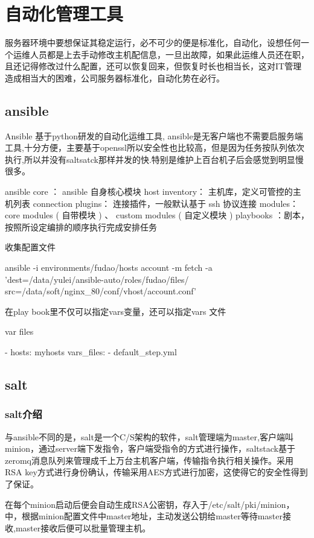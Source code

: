 \chapter{自动化管理工具}
服务器环境中要想保证其稳定运行，必不可少的便是标准化，自动化，设想任何一个运维人员都是上去手动修改主机配信息，一旦出故障，如果此运维人员还在职，且还记得修改过什么配置，还可以恢复回来，但恢复时长也相当长，这对IT管理造成相当大的困难，公司服务器标准化，自动化势在必行。
\section{ansible}
Ansible 基于python研发的自动化运维工具, ansible是无客户端也不需要启服务端工具,十分方便，主要基于openssl所以安全性也比较高，但是因为任务按队列依次执行,所以并没有saltsatck那样并发的快.特别是维护上百台机子后会感觉到明显慢很多。

ansible core ： ansible 自身核心模块
host inventory： 主机库，定义可管控的主机列表
connection plugins： 连接插件，一般默认基于 ssh 协议连接
modules：core modules ( 自带模块 ) 、 custom modules ( 自定义模块 )
playbooks ：剧本，按照所设定编排的顺序执行完成安排任务

收集配置文件

ansible -i environments/fudao/hosts  account -m fetch -a 'dest=/data/yulei/ansible-auto/roles/fudao/files/ src=/data/soft/nginx_80/conf/vhost/account.conf'

在play book里不仅可以指定vars变量，还可以指定vars 文件

var files

- hosts: myhosts
  vars_files:
    - default_step.yml


\section{salt}

\subsection{salt介绍}
与ansible不同的是，salt是一个C/S架构的软件，salt管理端为master,客户端叫minion，通过server端下发指令，客户端受指令的方式进行操作，saltstack基于zeromq消息队列来管理成千上万台主机客户端，传输指令执行相关操作。采用RSA key方式进行身份确认，传输采用AES方式进行加密，这使得它的安全性得到了保证。

在每个minion启动后便会自动生成RSA公密钥，存入于/etc/salt/pki/minion，中，根据minion配置文件中master地址，主动发送公钥给master等待master接收,master接收后便可以批量管理主机。

